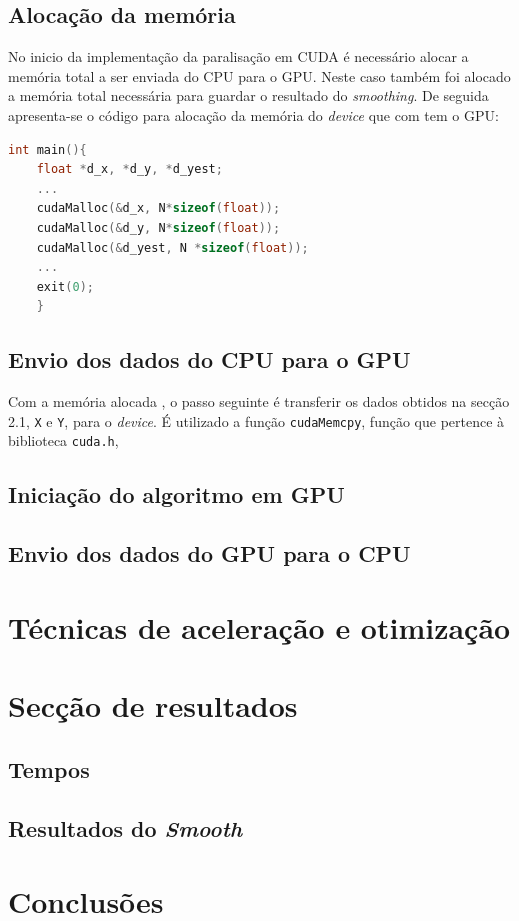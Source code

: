 \documentclass[11pt]{article}
\numberwithin{equation}{section}
\begin{document}
\subsection{Alocação da memória}
No inicio da implementação da paralisação em CUDA é necessário alocar a memória total a ser enviada do CPU para o GPU. Neste caso também foi alocado a memória total necessária para guardar o resultado do \textit{smoothing}. De seguida apresenta-se o código para alocação da memória do \textit{device} que com tem o GPU:
	\begin{lstlisting}[language=C]
	int main(){
	float *d_x, *d_y, *d_yest;
	...
	cudaMalloc(&d_x, N*sizeof(float)); 
	cudaMalloc(&d_y, N*sizeof(float));
	cudaMalloc(&d_yest, N *sizeof(float));
	...
	exit(0);
	}
	\end{lstlisting}
 
\subsection{Envio dos dados do CPU para o GPU}
Com a memória alocada , o passo seguinte é transferir os dados obtidos na secção 2.1, \texttt{X} e \texttt{Y}, para o \textit{device}. É utilizado a função \texttt{cudaMemcpy}, função que pertence à biblioteca \texttt{cuda.h},
\subsection{Iniciação do algoritmo em GPU}
\subsection{Envio dos dados do GPU para o CPU}
	
\section{Técnicas de aceleração e otimização}

\section{Secção de resultados}
\subsection{Tempos}
\subsection{Resultados do \textit{Smooth}}

\section{Conclusões}
\end{document}
